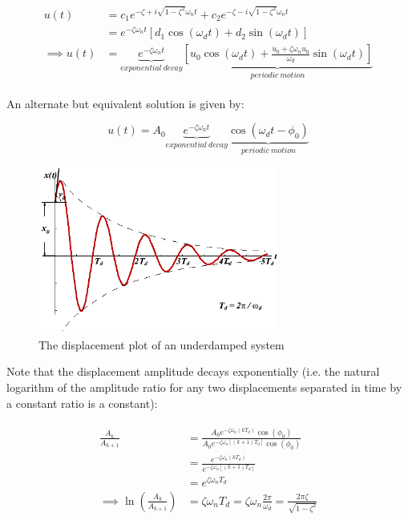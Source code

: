 \documentclass[10pt,b5paper,titlepage]{book}
\newenvironment{eqarray}
{
    \begin{eqnarray}
        \begin{aligned}
}
{
        \end{aligned}
    \end{eqnarray}
}
\begin{document}
\begin{eqarray}
    u(t) &= c_1 e^{-\zeta + i \sqrt{1 - \zeta^2} \omega_n t}
          + c_2 e^{-\zeta - i \sqrt{1 - \zeta^2} \omega_n t}\\
         &= e^{-\zeta \omega_n t} \left[ d_1 \cos{(\omega_d t)}
                                       + d_2 \sin{(\omega_d t)} \right]\\
    \implies u(t) &= \underbrace{e^{-\zeta \omega_n t}}_{exponential\ decay}
    \underbrace{\left[ u_0 \cos{(\omega_d t)}
    + \frac{\dot{u}_0 + \zeta \omega_n u_0}{\omega_d} \sin{(\omega_d t)}
    \right]}_{periodic\ motion}
\end{eqarray}

An alternate but equivalent solution is given by:

\begin{equation}
    u(t) = A_0 \underbrace{e^{-\zeta \omega_n t}}_{exponential\ decay}
    \underbrace{\cos{(\omega_d t - \phi_0)}}_{periodic\ motion}
\end{equation}

\begin{figure}[ht]
    \centering
    \includegraphics[width=0.70\textwidth]{img/SDOF_UnderDamped_Response.png}
    \caption{The displacement plot of an underdamped system}
    \label{fig:SDOF-underdamped-response-png}
\end{figure}

Note that the displacement amplitude decays exponentially (i.e. the natural
logarithm of the amplitude ratio for any two displacements separated in time
by a constant ratio is a constant):

\begin{eqarray}
    \frac{A_k}{A_{k+1}} &=
    \frac{A_0 e^{-\zeta \omega_n \left( k T_d \right)} \cos{ \left( \phi_0 \right) }}
         {A_0 e^{-\zeta \omega_n \left[ (k+1) T_d \right]} \cos{ \left( \phi_0 \right) }}\\
                        &=
    \frac{e^{-\zeta \omega_n \left( k T_d \right)}}
         {e^{-\zeta \omega_n \left[ (k+1) T_d \right]}}\\
                        &= e^{\zeta \omega_n T_d}\\
    \implies \ln{\left( \frac{A_k}{A_{k+1}} \right)} &=
    \zeta \omega_n T_d = \zeta \omega_n \frac{2 \pi}{\omega_d}
    = \frac{2 \pi \zeta}{\sqrt{1 - \zeta^2}}
\end{eqarray}
\end{document}
